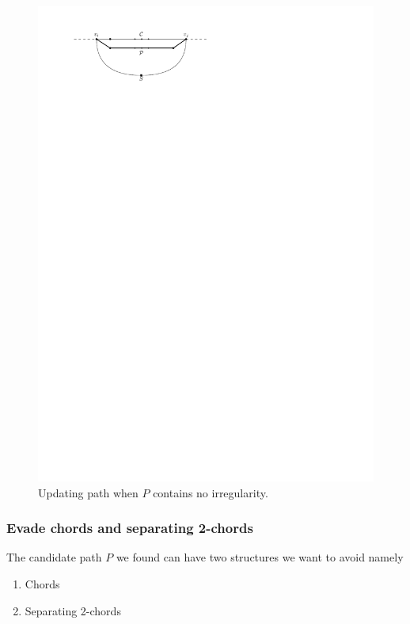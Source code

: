   \begin{figure}[h]
    \centering
    \includegraphics[scale=1]{unifiedAlgo/img/sweep/noIrregularity}
    \caption{Updating path when $P$ contains no irregularity.}
    \label{fig:sweep:noIrregularity}
  \end{figure}

\subsubsection{Evade chords and separating 2-chords}
  The candidate path $P$ we found can have two structures we want to avoid
  namely
  \begin{enumerate}
    \itemsep=-4pt
    \item Chords
    \item Separating 2-chords
  \end{enumerate}

